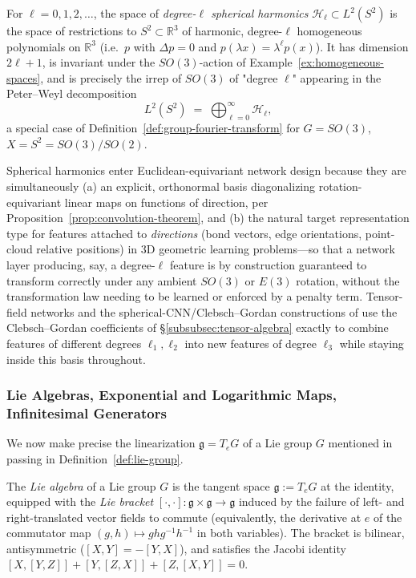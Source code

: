 \documentclass[mathematics,review,submit,moreauthors]{Definitions/mdpi}
\begin{document}
\begin{Definition}
\label{def:spherical-harmonics}
For $\ell = 0, 1, 2, \dots$, the space of \emph{degree-$\ell$ spherical
harmonics} $\mathcal{H}_\ell \subset L^2(S^2)$ is the space of restrictions
to $S^2 \subset \mathbb{R}^3$ of harmonic, degree-$\ell$ homogeneous
polynomials on $\mathbb{R}^3$ (i.e.\ $p$ with $\Delta p = 0$ and
$p(\lambda x) = \lambda^\ell p(x)$). It has dimension $2\ell+1$, is invariant
under the $SO(3)$-action of Example~\ref{ex:homogeneous-spaces}, and is
precisely the irrep of $SO(3)$ of "degree $\ell$" appearing in the
Peter--Weyl decomposition
\[
    L^2(S^2) \;=\; \bigoplus_{\ell = 0}^{\infty} \mathcal{H}_\ell,
\]
a special case of Definition~\ref{def:group-fourier-transform} for
$G = SO(3)$, $X = S^2 = SO(3)/SO(2)$.
\end{Definition}

Spherical harmonics enter Euclidean-equivariant network design because they
are simultaneously (a) an explicit, orthonormal basis diagonalizing
rotation-equivariant linear maps on functions of direction, per
Proposition~\ref{prop:convolution-theorem}, and (b) the natural target
representation type for features attached to \emph{directions} (bond
vectors, edge orientations, point-cloud relative positions) in 3D geometric
learning problems---so that a network layer producing, say, a degree-$\ell$
feature is by construction guaranteed to transform correctly under any
ambient $SO(3)$ or $E(3)$ rotation, without the transformation law needing
to be learned or enforced by a penalty term. Tensor-field networks and the
spherical-CNN/Clebsch--Gordan constructions of \cite{kondor2018p3icml} use
the Clebsch--Gordan coefficients of \S\ref{subsubsec:tensor-algebra} exactly
to combine features of different degrees $\ell_1, \ell_2$ into new features
of degree $\ell_3$ while staying inside this basis throughout.

\subsubsection{Lie Algebras, Exponential and Logarithmic Maps, Infinitesimal Generators}
\label{subsec:lie-algebras}

We now make precise the linearization $\mathfrak{g} = T_eG$ of a Lie group
$G$ mentioned in passing in Definition~\ref{def:lie-group}.

\begin{Definition}
\label{def:lie-algebra}
The \emph{Lie algebra} of a Lie group $G$ is the tangent space
$\mathfrak{g} := T_e G$ at the identity, equipped with the \emph{Lie
bracket} $[\cdot,\cdot] : \mathfrak{g} \times \mathfrak{g} \to \mathfrak{g}$
induced by the failure of left- and right-translated vector fields to
commute (equivalently, the derivative at $e$ of the commutator map
$(g,h) \mapsto ghg^{-1}h^{-1}$ in both variables). The bracket is bilinear,
antisymmetric ($[X,Y] = -[Y,X]$), and satisfies the Jacobi identity
$[X,[Y,Z]] + [Y,[Z,X]] + [Z,[X,Y]] = 0$.
\end{Definition}
\end{document}

